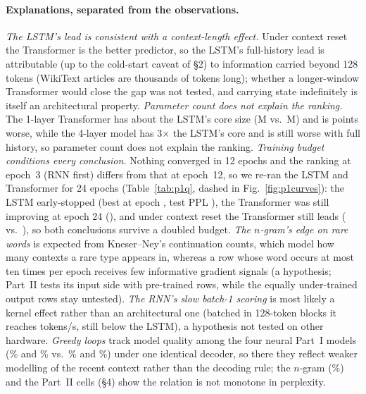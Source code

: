 \documentclass[10pt,a4paper]{article}
\begin{document}
\paragraph{Explanations, separated from the observations.}
\emph{The LSTM's lead is consistent with a context-length effect.} Under context reset the Transformer is the better predictor, so the LSTM's full-history lead is attributable (up to the cold-start caveat of \S2) to information carried beyond 128 tokens (WikiText articles are thousands of tokens long); whether a longer-window Transformer would close the gap was not tested, and carrying state indefinitely is itself an architectural property. \emph{Parameter count does not explain the ranking.} The 1-layer Transformer has about the
LSTM's core size (\coreMTransformerOne{}M vs.\ \coreMLSTM{}M) and is \deltaOneLayerVsLSTM{} points
worse, while the 4-layer model has 3$\times$ the LSTM's core and is still worse with full history, so parameter count does not explain the ranking.
\emph{Training budget conditions every conclusion.} Nothing converged in 12 epochs and the ranking at epoch~3 (RNN first) differs from that at epoch~12, so we re-ran the LSTM and Transformer for 24 epochs (Table~\ref{tab:p1q}, dashed in Fig.~\ref{fig:p1curves}): the LSTM early-stopped (best at epoch \bestEpochLongLSTM, test PPL \pplLongLSTM), the Transformer was still improving at epoch 24 (\pplLongTransformer), and under context reset the Transformer still leads (\pplLongBlocksTransformer{} vs.\ \pplLongBlocksLSTM), so both conclusions survive a doubled budget. \emph{The $n$-gram's edge on rare words} is
expected from Kneser--Ney's continuation counts, which model how many contexts a rare type appears in,
whereas a row whose word occurs at most ten times per epoch receives few informative gradient signals
(a hypothesis; Part~II tests its input side with pre-trained rows, while the equally under-trained output rows stay untested). \emph{The RNN's slow batch-1 scoring} is most likely a kernel effect rather than an architectural one (batched in 128-token blocks it reaches \scoreBlocksTokSRNN{} tokens/s, still below the LSTM), a hypothesis not tested on other hardware. \emph{Greedy loops} track model quality among the four neural Part~I models (\repGreedyRNN\% and \repGreedyTransformerOne\% vs.\ \repGreedyLSTM\% and \repGreedyTransformer\%) under one identical decoder, so there they reflect weaker modelling of the recent context rather than the decoding rule; the $n$-gram (\repGreedyNgram\%) and the Part~II cells (\S4) show the relation is not monotone in perplexity.
\end{document}
